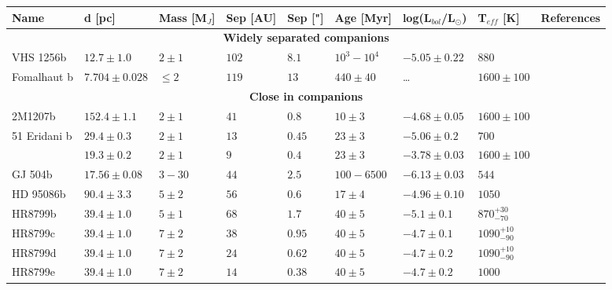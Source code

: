 \begin{landscape}
	\begin{table}[t]
		\centering
		\begin{small}
			\begin{tabular}{lllllllll}
				\toprule
				\textbf{Name} & \textbf{d [pc]} & \textbf{Mass [M$_{J}$]} & \textbf{Sep [AU]} & \textbf{Sep ["]} & \textbf{Age [Myr]} & \textbf{log(L$_{bol}$/L$_{\odot}$)} & \textbf{T$_{eff}$ [K]} & \textbf{References}\\
				\midrule
				\multicolumn{9}{c}{\textbf{Widely separated companions}}\\
				\midrule
				VHS 1256b & $12.7\pm1.0$  & $2\pm1$     & $102$ & $8.1$ & $10^{3}-10^{4}$ & $-5.05\pm0.22$ & $880$ & \parencite{Gauza2015}\\
				Fomalhaut b & $7.704\pm0.028$ & $\leq 2$ & $119$ & $13$ & $440\pm40$ & \ldots & $1600\pm100$ &\\
				\midrule
				\multicolumn{9}{c}{\textbf{Close in companions}}\\
				\midrule
				2M1207b   & $152.4\pm1.1$ & $2\pm1$     & $41$ & $0.8$ & $10\pm3$ & $-4.68\pm0.05$ & $1600\pm100$ &\\
				51 Eridani b & $29.4\pm0.3$ & $2\pm1$   & $13$ & $0.45$ & $23\pm3$ & $-5.06\pm0.2$ & $700$ &  \parencite{Macintosh2015}\\
				\bpic     & $19.3\pm0.2$  & $2\pm1$     & $9$ & $0.4$ & $23\pm3$ & $-3.78\pm0.03$ & $1600\pm100$ & \parencite{Quanz2010}\\
				GJ 504b   & $17.56\pm0.08$  & $3-30$    & $44$ & $2.5$ & $100-6500$ & $-6.13\pm0.03$ & $544$ & \parencite{Skemer2016}\\
				HD 95086b & $90.4\pm3.3$  & $5\pm2$     & $56$ & $0.6$ & $17\pm4$ & $-4.96\pm0.10$ & $1050$  &\parencite{DeRosa2016}\\	
				HR8799b   & $39.4\pm1.0$  & $5\pm1$     & $68$ & $1.7$ & $40\pm5$ & $-5.1\pm0.1$ & $870^{+30}_{-70}$ & \parencite{Marois2008,Skemer2012}\\
				HR8799c   & $39.4\pm1.0$  & $7\pm2$     & $38$ & $0.95$ & $40\pm5$ & $-4.7\pm0.1$ & $1090^{+10}_{-90}$ &\parencite{Marois2008,Skemer2012}\\
				HR8799d   & $39.4\pm1.0$  & $7\pm2$     & $24$ & $0.62$ & $40\pm5$ & $-4.7\pm0.2$ & $1090^{+10}_{-90}$ &\parencite{Marois2008,Skemer2012}\\
				HR8799e   & $39.4\pm1.0$  & $7\pm2$     & $14$ & $0.38$ & $40\pm5$ & $-4.7\pm0.2$ & $1000$ &\parencite{Marois2008,Skemer2012}\\	

\end{tabular}
\end{small}
\end{table}
\end{landscape}
